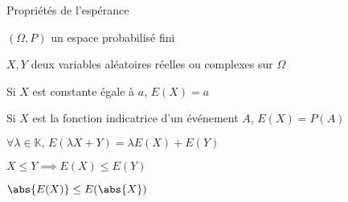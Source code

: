     \begin{prop}{Propriétés de l’espérance}{}
        \begin{soient}
            \item $(\Omega,P)$ un espace probabilisé fini
            \item $X,Y$ deux variables aléatoires réelles ou complexes sur $\Omega$
        \end{soient}
        \begin{alors}
            \item Si $X$ est constante égale à $a$, $E(X) = a$
            \item Si $X$ est la fonction indicatrice d’un événement $A$, $E(X) = P(A)$
            \item $\forall \lambda \in \mathbb{K}, \, E(\lambda X + Y) = \lambda E(X) + E(Y)$
            \item $X \leq Y \implies E(X) \leq E(Y)$
            \item $\abs{E(X)} \leq E(\abs{X})$
        \end{alors}
    \end{prop}

